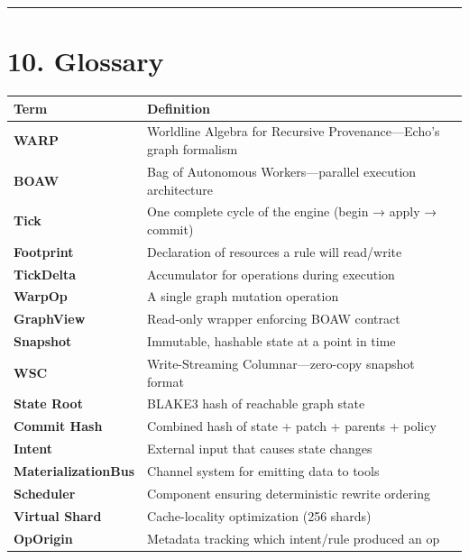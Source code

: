 \documentclass[
]{book}
\newcounter{none} %
\begin{document}
\begin{center}\rule{0.5\linewidth}{0.5pt}\end{center}

\section{10. Glossary}\label{glossary}

{\def\LTcaptype{none} %
\begin{longtable}[]{@{}
  >{\raggedright\arraybackslash}p{}
  >{\raggedright\arraybackslash}p{}@{}}
\toprule\noalign{}
\begin{minipage}[b]{\linewidth}\raggedright
Term
\end{minipage} & \begin{minipage}[b]{\linewidth}\raggedright
Definition
\end{minipage} \\
\midrule\noalign{}
\endhead
\bottomrule\noalign{}
\endlastfoot
\textbf{WARP} & Worldline Algebra for Recursive Provenance---Echo's
graph formalism \\
\textbf{BOAW} & Bag of Autonomous Workers---parallel execution
architecture \\
\textbf{Tick} & One complete cycle of the engine (begin → apply →
commit) \\
\textbf{Footprint} & Declaration of resources a rule will read/write \\
\textbf{TickDelta} & Accumulator for operations during execution \\
\textbf{WarpOp} & A single graph mutation operation \\
\textbf{GraphView} & Read-only wrapper enforcing BOAW contract \\
\textbf{Snapshot} & Immutable, hashable state at a point in time \\
\textbf{WSC} & Write-Streaming Columnar---zero-copy snapshot format \\
\textbf{State Root} & BLAKE3 hash of reachable graph state \\
\textbf{Commit Hash} & Combined hash of state + patch + parents +
policy \\
\textbf{Intent} & External input that causes state changes \\
\textbf{MaterializationBus} & Channel system for emitting data to
tools \\
\textbf{Scheduler} & Component ensuring deterministic rewrite
ordering \\
\textbf{Virtual Shard} & Cache-locality optimization (256 shards) \\
\textbf{OpOrigin} & Metadata tracking which intent/rule produced an
op \\
\end{longtable}
}
\end{document}
